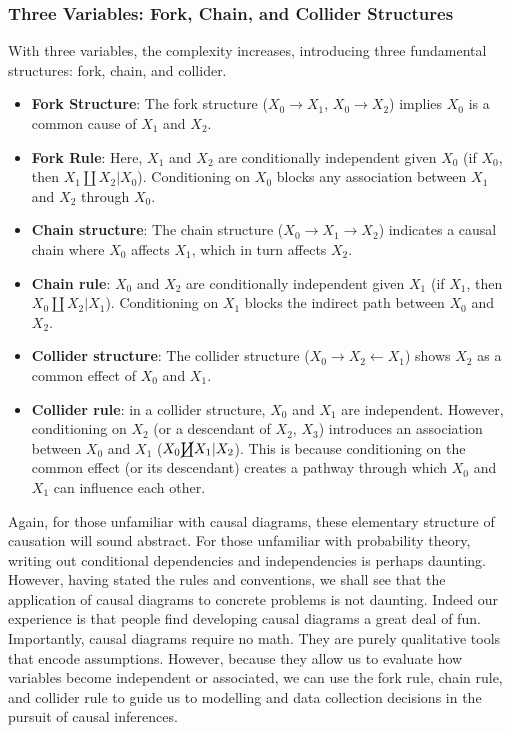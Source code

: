 \documentclass[
  singlecolumn]{article}
\begin{document}
\subsubsection{Three Variables: Fork, Chain, and Collider
Structures}\label{three-variables-fork-chain-and-collider-structures}

With three variables, the complexity increases, introducing three
fundamental structures: fork, chain, and collider.

\begin{itemize}
\item
  \textbf{Fork Structure}: The fork structure (\(X_0 \rightarrow X_1\),
  \(X_0 \rightarrow X_2\)) implies \(X_0\) is a common cause of \(X_1\)
  and \(X_2\).
\item
  \textbf{Fork Rule}: Here, \(X_1\) and \(X_2\) are conditionally
  independent given \(X_0\) (if \(\boxed{X_0}\), then
  \(X_1 \coprod X_2 | X_0\)). Conditioning on \(X_0\) blocks any
  association between \(X_1\) and \(X_2\) through \(X_0\).
\item
  \textbf{Chain structure}: The chain structure
  (\(X_0 \rightarrow X_1 \rightarrow X_2\)) indicates a causal chain
  where \(X_0\) affects \(X_1\), which in turn affects \(X_2\).
\item
  \textbf{Chain rule}: \(X_0\) and \(X_2\) are conditionally independent
  given \(X_1\) (if \(\boxed{X_1}\), then \(X_0 \coprod X_2 | X_1\)).
  Conditioning on \(X_1\) blocks the indirect path between \(X_0\) and
  \(X_2\).
\item
  \textbf{Collider structure}: The collider structure
  (\(X_0 \rightarrow X_2 \leftarrow X_1\)) shows \(X_2\) as a common
  effect of \(X_0\) and \(X_1\).
\item
  \textbf{Collider rule}: in a collider structure, \(X_0\) and \(X_1\)
  are independent. However, conditioning on \(X_2\) (or a descendant of
  \(X_2\), \(X_3\)) introduces an association between \(X_0\) and
  \(X_1\) (\(X_0 \cancel\coprod X_1 | X_2\)). This is because
  conditioning on the common effect (or its descendant) creates a
  pathway through which \(X_0\) and \(X_1\) can influence each other.
\end{itemize}

Again, for those unfamiliar with causal diagrams, these elementary
structure of causation will sound abstract. For those unfamiliar with
probability theory, writing out conditional dependencies and
independencies is perhaps daunting. However, having stated the rules and
conventions, we shall see that the application of causal diagrams to
concrete problems is not daunting. Indeed our experience is that people
find developing causal diagrams a great deal of fun. Importantly, causal
diagrams require no math. They are purely qualitative tools that encode
assumptions. However, because they allow us to evaluate how variables
become independent or associated, we can use the fork rule, chain rule,
and collider rule to guide us to modelling and data collection decisions
in the pursuit of causal inferences.
\end{document}
